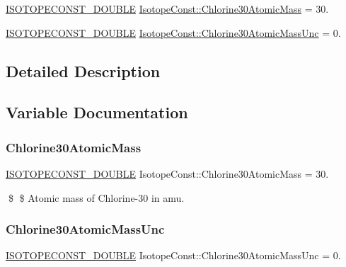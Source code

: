 \begin{DoxyCompactItemize}
\item 
\mbox{\hyperlink{group___isotope_const-_macros_ga8f45a7272ce02c0b4c65c44636ed719a}{I\+S\+O\+T\+O\+P\+E\+C\+O\+N\+S\+T\+\_\+\+D\+O\+U\+B\+LE}} \mbox{\hyperlink{group___isotope_const-_chlorine-_cl30_ga472e283f959257901112b65c534f652e}{Isotope\+Const\+::\+Chlorine30\+Atomic\+Mass}} = 30.
\item 
\mbox{\hyperlink{group___isotope_const-_macros_ga8f45a7272ce02c0b4c65c44636ed719a}{I\+S\+O\+T\+O\+P\+E\+C\+O\+N\+S\+T\+\_\+\+D\+O\+U\+B\+LE}} \mbox{\hyperlink{group___isotope_const-_chlorine-_cl30_ga947f8ba43413a984852161cef22bc05d}{Isotope\+Const\+::\+Chlorine30\+Atomic\+Mass\+Unc}} = 0.
\end{DoxyCompactItemize}


\subsection{Detailed Description}


\subsection{Variable Documentation}
\mbox{\label{group___isotope_const-_chlorine-_cl30_ga472e283f959257901112b65c534f652e}} 
\subsubsection{\texorpdfstring{Chlorine30\+Atomic\+Mass}{Chlorine30AtomicMass}}
{\footnotesize\ttfamily \mbox{\hyperlink{group___isotope_const-_macros_ga8f45a7272ce02c0b4c65c44636ed719a}{I\+S\+O\+T\+O\+P\+E\+C\+O\+N\+S\+T\+\_\+\+D\+O\+U\+B\+LE}} Isotope\+Const\+::\+Chlorine30\+Atomic\+Mass = 30.}

\$ \$ Atomic mass of Chlorine-\/30 in amu. \mbox{\label{group___isotope_const-_chlorine-_cl30_ga947f8ba43413a984852161cef22bc05d}} 
\subsubsection{\texorpdfstring{Chlorine30\+Atomic\+Mass\+Unc}{Chlorine30AtomicMassUnc}}
{\footnotesize\ttfamily \mbox{\hyperlink{group___isotope_const-_macros_ga8f45a7272ce02c0b4c65c44636ed719a}{I\+S\+O\+T\+O\+P\+E\+C\+O\+N\+S\+T\+\_\+\+D\+O\+U\+B\+LE}} Isotope\+Const\+::\+Chlorine30\+Atomic\+Mass\+Unc = 0.}

